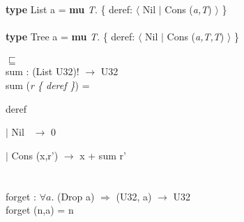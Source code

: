 \documentclass{article}
\begin{document}
\lstset{language=Pascal}          %


\textbf{type} List a = \textbf{mu} \textit{T}. \{ deref: $\langle$ Nil $\vert$ Cons (\textit{a,T}) $\rangle$ \} \\ \\

\textbf{type} Tree a = \textbf{mu} \textit{T}. \{ deref: $\langle$ Nil $\vert$ Cons (\textit{a,T,T}) $\rangle$ \}  \\ \\

$\sqsubseteq$ \\


\noindent
sum : (List U32)! $\rightarrow$ U32 \\
sum (\textit{r \{ deref \}}) = 

    deref

    $\vert$ Nil  \quad\quad\quad$\,$   $\rightarrow$ 0

    $\vert$ Cons (x,r')  $\rightarrow$ x + sum r' \\ \\ \\

\noindent
forget : $\forall a.$ (Drop a) $\Rightarrow$ (U32, a) $\rightarrow$ U32 \\
forget (n,a) = n
\end{document}
